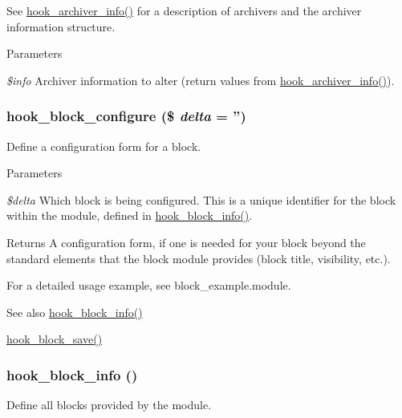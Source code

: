 See \hyperlink{group__hooks_ga1c5bd8d11e7d54242528f85434e5b260}{hook\_\-archiver\_\-info()} for a description of archivers and the archiver information structure.


\begin{DoxyParams}{Parameters}
\item[{\em \$info}]Archiver information to alter (return values from \hyperlink{group__hooks_ga1c5bd8d11e7d54242528f85434e5b260}{hook\_\-archiver\_\-info()}). \end{DoxyParams}
\hypertarget{group__hooks_gacc86fefd1e0299f387f79a37dd1a48b7}{
\subsubsection[{hook\_\-block\_\-configure}]{\setlength{\rightskip}{0pt plus 5cm}hook\_\-block\_\-configure (\$ {\em delta} = {\ttfamily ''})}}
\label{group__hooks_gacc86fefd1e0299f387f79a37dd1a48b7}
Define a configuration form for a block.


\begin{DoxyParams}{Parameters}
\item[{\em \$delta}]Which block is being configured. This is a unique identifier for the block within the module, defined in \hyperlink{group__hooks_ga2bd926c3e90deeba0c3ba64fb3c64d73}{hook\_\-block\_\-info()}.\end{DoxyParams}
\begin{DoxyReturn}{Returns}
A configuration form, if one is needed for your block beyond the standard elements that the block module provides (block title, visibility, etc.).
\end{DoxyReturn}
For a detailed usage example, see block\_\-example.module.

\begin{DoxySeeAlso}{See also}
\hyperlink{group__hooks_ga2bd926c3e90deeba0c3ba64fb3c64d73}{hook\_\-block\_\-info()} 

\hyperlink{group__hooks_ga622024ce4f818c241ca7a765e829f928}{hook\_\-block\_\-save()} 
\end{DoxySeeAlso}
\hypertarget{group__hooks_ga2bd926c3e90deeba0c3ba64fb3c64d73}{
\subsubsection[{hook\_\-block\_\-info}]{\setlength{\rightskip}{0pt plus 5cm}hook\_\-block\_\-info ()}}
\label{group__hooks_ga2bd926c3e90deeba0c3ba64fb3c64d73}
Define all blocks provided by the module.

